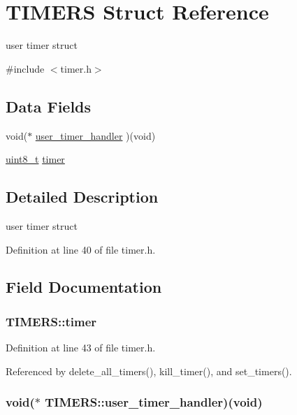 \hypertarget{structTIMERS}{\section{T\-I\-M\-E\-R\-S Struct Reference}
\label{structTIMERS}
}


user timer struct  




{\ttfamily \#include $<$timer.\-h$>$}

\subsection*{Data Fields}
\begin{DoxyCompactItemize}
\item 
void($\ast$ \hyperlink{structTIMERS_a66bb89d328cf2c3f1b9362d7ea207c29}{user\-\_\-timer\-\_\-handler} )(void)
\item 
\hyperlink{send_8c_aba7bc1797add20fe3efdf37ced1182c5}{uint8\-\_\-t} \hyperlink{structTIMERS_a0b10fdb7b0e6b1d3ca49718f47c4514d}{timer}
\end{DoxyCompactItemize}


\subsection{Detailed Description}
user timer struct 

Definition at line 40 of file timer.\-h.



\subsection{Field Documentation}
\hypertarget{structTIMERS_a0b10fdb7b0e6b1d3ca49718f47c4514d}{
\subsubsection[{timer}]{ T\-I\-M\-E\-R\-S\-::timer}}\label{structTIMERS_a0b10fdb7b0e6b1d3ca49718f47c4514d}


Definition at line 43 of file timer.\-h.



Referenced by delete\-\_\-all\-\_\-timers(), kill\-\_\-timer(), and set\-\_\-timers().

\hypertarget{structTIMERS_a66bb89d328cf2c3f1b9362d7ea207c29}{
\subsubsection[{user\-\_\-timer\-\_\-handler}]{\setlength{\rightskip}{0pt plus 5cm}void($\ast$ T\-I\-M\-E\-R\-S\-::user\-\_\-timer\-\_\-handler)(void)}}\label{structTIMERS_a66bb89d328cf2c3f1b9362d7ea207c29}


